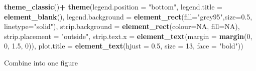 \documentclass[
]{article}
\newenvironment{Shaded}{\begin{snugshade}}{\end{snugshade}}
\newcommand{\DataTypeTok}[1]{\textcolor[rgb]{0.13,0.29,0.53}{#1}}
\newcommand{\DecValTok}[1]{\textcolor[rgb]{0.00,0.00,0.81}{#1}}
\newcommand{\FloatTok}[1]{\textcolor[rgb]{0.00,0.00,0.81}{#1}}
\newcommand{\KeywordTok}[1]{\textcolor[rgb]{0.13,0.29,0.53}{\textbf{#1}}}
\newcommand{\NormalTok}[1]{#1}
\newcommand{\OperatorTok}[1]{\textcolor[rgb]{0.81,0.36,0.00}{\textbf{#1}}}
\newcommand{\OtherTok}[1]{\textcolor[rgb]{0.56,0.35,0.01}{#1}}
\newcommand{\StringTok}[1]{\textcolor[rgb]{0.31,0.60,0.02}{#1}}
\begin{document}
\begin{Shaded}
\begin{Highlighting}[]
\StringTok{  }\KeywordTok{theme\_classic}\NormalTok{()}\OperatorTok{+}
\StringTok{  }\KeywordTok{theme}\NormalTok{(}\DataTypeTok{legend.position =} \StringTok{"bottom"}\NormalTok{, }\DataTypeTok{legend.title =} \KeywordTok{element\_blank}\NormalTok{(), }\DataTypeTok{legend.background =} \KeywordTok{element\_rect}\NormalTok{(}\DataTypeTok{fill=}\StringTok{"grey95"}\NormalTok{,}\DataTypeTok{size=}\FloatTok{0.5}\NormalTok{, }\DataTypeTok{linetype=}\StringTok{"solid"}\NormalTok{), }\DataTypeTok{strip.background =} \KeywordTok{element\_rect}\NormalTok{(}\DataTypeTok{colour=}\OtherTok{NA}\NormalTok{, }\DataTypeTok{fill=}\OtherTok{NA}\NormalTok{), }\DataTypeTok{strip.placement =} \StringTok{"outside"}\NormalTok{, }\DataTypeTok{strip.text.x =} \KeywordTok{element\_text}\NormalTok{(}\DataTypeTok{margin =} \KeywordTok{margin}\NormalTok{(}\DecValTok{0}\NormalTok{, }\DecValTok{0}\NormalTok{, }\FloatTok{1.5}\NormalTok{, }\DecValTok{0}\NormalTok{)), }\DataTypeTok{plot.title =} \KeywordTok{element\_text}\NormalTok{(}\DataTypeTok{hjust =} \FloatTok{0.5}\NormalTok{, }\DataTypeTok{size =} \DecValTok{13}\NormalTok{, }\DataTypeTok{face =} \StringTok{"bold"}\NormalTok{)) }
\end{Highlighting}
\end{Shaded}

Combine into one figure
\end{document}

